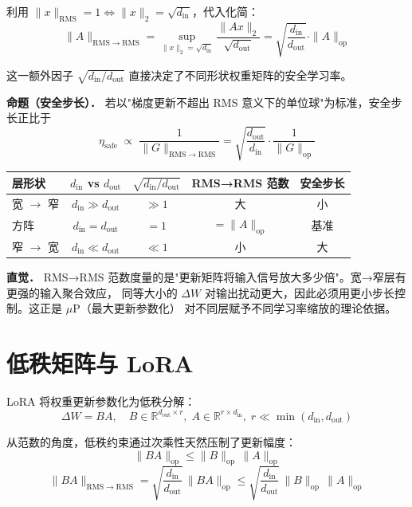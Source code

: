 \documentclass[12pt, a4paper]{article}
\newcommand{\RMS}{\mathrm{RMS}}
\newcommand{\op}{\mathrm{op}}
\begin{document}
利用 $\|x\|_{\RMS}=1 \iff \|x\|_2 = \sqrt{d_{\mathrm{in}}}$，代入化简：
\[
  \|A\|_{\RMS\to\RMS}
  = \sup_{\|x\|_2 = \sqrt{d_{\mathrm{in}}}}
    \frac{\|Ax\|_2}{\sqrt{d_{\mathrm{out}}}}
  = \sqrt{\frac{d_{\mathrm{in}}}{d_{\mathrm{out}}}} \cdot \|A\|_{\op}
\]

这一额外因子 $\sqrt{d_{\mathrm{in}}/d_{\mathrm{out}}}$ 直接决定了不同形状权重矩阵的安全学习率。

\begin{propbox}
\textbf{命题（安全步长）．} 若以"梯度更新不超出 RMS 意义下的单位球"为标准，安全步长正比于
\[
  \eta_{\mathrm{safe}}
  \;\propto\;
  \frac{1}{\|G\|_{\RMS\to\RMS}}
  = \sqrt{\frac{d_{\mathrm{out}}}{d_{\mathrm{in}}}} \cdot \frac{1}{\|G\|_{\op}}
\]
\end{propbox}

\begin{center}
\begin{tabular}{lcccc}
\toprule
层形状 & $d_{\mathrm{in}}$ vs $d_{\mathrm{out}}$ & $\sqrt{d_{\mathrm{in}}/d_{\mathrm{out}}}$ & RMS→RMS 范数 & 安全步长 \\
\midrule
宽 $\to$ 窄 & $d_{\mathrm{in}} \gg d_{\mathrm{out}}$ & $\gg 1$ & 大 & 小 \\
方阵         & $d_{\mathrm{in}} = d_{\mathrm{out}}$ & $= 1$   & $= \|A\|_{\op}$ & 基准 \\
窄 $\to$ 宽 & $d_{\mathrm{in}} \ll d_{\mathrm{out}}$ & $\ll 1$ & 小 & 大 \\
\bottomrule
\end{tabular}
\end{center}

\begin{rembox}
\textbf{直觉．} RMS→RMS 范数度量的是"更新矩阵将输入信号放大多少倍"。宽→窄层有更强的输入聚合效应，
同等大小的 $\Delta W$ 对输出扰动更大，因此必须用更小步长控制。这正是 $\mu$P（最大更新参数化）
对不同层赋予不同学习率缩放的理论依据。
\end{rembox}

\section{低秩矩阵与 LoRA}

LoRA 将权重更新参数化为低秩分解：
\[
  \Delta W = BA,
  \quad
  B \in \mathbb{R}^{d_{\mathrm{out}}\times r},\;
  A \in \mathbb{R}^{r \times d_{\mathrm{in}}},\;
  r \ll \min(d_{\mathrm{in}}, d_{\mathrm{out}})
\]

从范数的角度，低秩约束通过次乘性天然压制了更新幅度：
\[
  \|BA\|_{\op} \leq \|B\|_{\op}\,\|A\|_{\op}
\]
\[
  \|BA\|_{\RMS\to\RMS}
  = \sqrt{\frac{d_{\mathrm{in}}}{d_{\mathrm{out}}}}\,\|BA\|_{\op}
  \leq \sqrt{\frac{d_{\mathrm{in}}}{d_{\mathrm{out}}}}\,\|B\|_{\op}\,\|A\|_{\op}
\]
\end{document}
